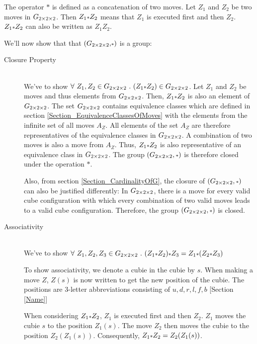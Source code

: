 The operator $\scriptstyle*$ is defined as a concatenation of two moves. Let $Z_1$ and $Z_2$ be two moves in $G_{2\times 2\times 2}$. Then $Z_1 \mathlarger{\scriptstyle*} Z_2$ means that $Z_1$ is executed first and then $Z_2$. $Z_1 \mathlarger{\scriptstyle*} Z_2$ can also be written as $Z_1Z_2$.

We'll now show that  that $\left(G_{2\times 2\times 2}, \scriptstyle*\right)$ is a group: 


\begin{description}
\item [Closure Property] \ \\
We've to show $\forall \ Z_1,Z_2 \in \Gtwo \ . \ (Z_1 \mathlarger{\scriptstyle *} Z_2) \in G_{2\times 2\times 2}$. Let $Z_1$ and $Z_2$ be moves and thus elements from $G_{2\times 2\times 2}$. Then, $Z_1 \mathlarger{\scriptstyle*} Z_2$ is also an element of $G_{2\times 2\times 2}$. The set $G_{2\times 2\times 2}$ contains equivalence classes which are defined in section \ref{Section_EquivalenceClassesOfMoves} with the elements from the infinite set of all moves $A_Z$. All elements of the set $A_Z$ are therefore representatives of the equivalence classes in $G_{2\times 2\times 2}$. A combination of two moves is also a move from $A_Z$. Thus, $Z_1 \mathlarger{\scriptstyle*} Z_2$ is also representative of an equivalence class in $G_{2\times 2\times 2}$. The group $\left(\Gtwo, \mathlarger{\scriptstyle*}\right)$ is therefore closed under the operation $\scriptstyle*$.
 
Also, from section \ref{Section_CardinalityOfG}, the closure of $(\Gtwo, \mathlarger{\scriptstyle*})$ can also be justified differently: In $G_{2\times 2\times 2}$, there is a move for every valid cube configuration with which every combination of two valid moves leads to a valid cube configuration. Therefore, the group $\left(\Gtwo, \mathlarger{\scriptstyle*}\right)$ is closed.


\item [Associativity] \ \\
We've to show $\forall \ Z_1,Z_2,Z_3 \in \Gtwo \ . \ (Z_1 \mathlarger{\scriptstyle*} Z_2) \mathlarger{\scriptstyle*} Z_3 = Z_1 \mathlarger{\scriptstyle*} (Z_2 \mathlarger{\scriptstyle*} Z_3)$

To show associativity, we denote a cubie in the cubie by $s$. When making a move $Z$, $Z(s)$ is now written to get the new position of the cubie. The positions are 3-letter abbreviations consisting of $u, d, r, l, f, b$ [Section \ref{Name}]

When considering $Z_1 \mathlarger{\scriptstyle*} Z_2 $, $Z_1$ is executed first and then $Z_2$. $Z_1$ moves the cubie $s$ to the position $Z_1(s)$. The move $Z_2$ then moves the cubie to the position $Z_2(Z_1(s))$. Consequently, $Z_1 \mathlarger{\scriptstyle*} Z_2 = Z_2(Z_1(s))$.



\end{description}
